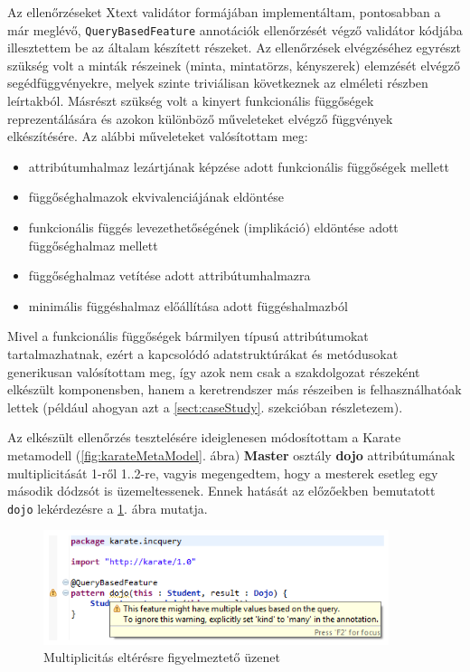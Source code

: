 Az ellenőrzéseket Xtext validátor formájában implementáltam, pontosabban a már meglévő, \texttt{QueryBasedFeature} annotációk ellenőrzését végző validátor kódjába illesztettem be az általam készített részeket.
Az ellenőrzések elvégzéséhez egyrészt szükség volt a minták részeinek (minta, mintatörzs, kényszerek) elemzését elvégző segédfüggvényekre, melyek szinte triviálisan következnek az elméleti részben leírtakból.
Másrészt szükség volt a kinyert funkcionális függőségek reprezentálására és azokon különböző műveleteket elvégző függvények elkészítésére.
Az alábbi műveleteket valósítottam meg:
\begin{itemize}
    \item attribútumhalmaz lezártjának képzése adott funkcionális függőségek mellett
    \item függőséghalmazok ekvivalenciájának eldöntése
    \item funkcionális függés levezethetőségének (implikáció) eldöntése adott függőséghalmaz mellett
    \item függőséghalmaz vetítése adott attribútumhalmazra
    \item minimális függéshalmaz előállítása adott függéshalmazból
\end{itemize}

Mivel a funkcionális függőségek bármilyen típusú attribútumokat tartalmazhatnak, ezért a kapcsolódó adatstruktúrákat és metódusokat generikusan valósítottam meg, így azok nem csak a szakdolgozat részeként elkészült komponensben, hanem a keretrendszer más részeiben is felhasználhatóak lettek (például ahogyan azt a \ref{sect:caseStudy}. szekcióban részletezem).

Az elkészült ellenőrzés tesztelésére ideiglenesen módosítottam a Karate metamodell (\ref{fig:karateMetaModel}. ábra) \textbf{Master} osztály \textbf{dojo} attribútumának multiplicitását 1-ről 1..2-re, vagyis megengedtem, hogy a mesterek esetleg egy második dódzsót is üzemeltessenek.
Ennek hatását az előzőekben bemutatott \texttt{dojo} lekérdezésre a \ref{fig:funcDepManyWarning}. ábra mutatja.
\begin{figure}[htb]
\centering
\includegraphics[width=0.9\textwidth]{figures/func-dep-many-warning.png}
\caption{Multiplicitás eltérésre figyelmeztető üzenet}
\label{fig:funcDepManyWarning}
\end{figure}

